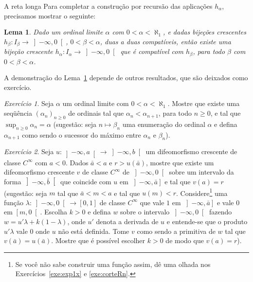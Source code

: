 \documentclass[oneside,11pt]{amsart}
\theoremstyle{remark}\newtheorem{exercise}{Exercício}[section]
\theoremstyle{plain}\newtheorem{teo}{Teorema}[section]
\theoremstyle{plain}\newtheorem{lem}[teo]{Lema}
\theoremstyle{plain}\newtheorem{prop}[teo]{Proposição}
\theoremstyle{definition}\newtheorem{defin}[teo]{Definição}
\theoremstyle{remark}\newtheorem{rem}[teo]{Observação}
\theoremstyle{definition}\newtheorem{example}[teo]{Exemplo}
\numberwithin{equation}{section}
\begin{document}
\begin{section}{A reta longa}
Para completar a construção por recursão das aplicações $h_\alpha$, precisamos mostrar o seguinte:
\begin{lem}\label{thm:lemaordlim}
Dado um ordinal limite $\alpha$ com $0<\alpha<\aleph_1$, e dadas bijeções crescentes $h_\beta:I_\beta\to\left]-\infty,0\right[$, $0<\beta<\alpha$,
duas a duas compatíveis, então existe uma bijeção crescente $h_\alpha:I_\alpha\to\left]-\infty,0\right[$ que é compatível com $h_\beta$, para todo $\beta$
com $0<\beta<\alpha$.
\end{lem}

A demonstração do Lema~\ref{thm:lemaordlim} depende de outros resultados, que são deixados como exercício.

\begin{exercise}\label{exe:cofomega}
Seja $\alpha$ um ordinal limite com $0<\alpha<\aleph_1$. Mostre que existe uma seqüência $(\alpha_n)_{n\ge0}$ de ordinais tal que
$\alpha_n<\alpha_{n+1}$, para todo $n\ge0$, e tal que $\sup_{n\ge0}\alpha_n=\alpha$ (sugestão: seja $n\mapsto\beta_n$ uma enumeração
do ordinal $\alpha$ e defina $\alpha_{n+1}$ como sendo o sucessor do máximo entre $\alpha_n$ e $\beta_n$).
\end{exercise}

\begin{exercise}\label{exe:extenddifeo}
Seja $u:\left]-\infty,a\right[\to\left]-\infty,b\right[$ um difeomorfismo crescente de classe $C^\infty$ com $a<0$. Dados $\bar a<a$ e $r>u(\bar a)$, mostre que existe
um difeomorfismo crescente $v$ de classe $C^\infty$ de $\left]-\infty,0\right[$ sobre um intervalo da forma $\left]-\infty,\bar b\right[$
que coincide com $u$ em $\left]-\infty,\bar a\right]$
e tal que $v(a)=r$ (sugestão: seja $m$ tal que $\bar a<m<a$ e tal que $u(m)<r$. Considere\footnote{%
Se você não sabe construir uma função assim, dê uma olhada nos Exercícios~\ref{exe:exp1x} e \ref{exe:corteRn}.}
uma função $\lambda:\left]-\infty,0\right[\to[0,1]$
de classe $C^\infty$ que vale $1$ em $\left]-\infty,\bar a\right]$ e vale $0$ em $\left[m,0\right[$. Escolha $k>0$ e defina $w$ sobre o intervalo
$\left]-\infty,0\right[$ fazendo $w=u'\lambda+k(1-\lambda)$, onde $u'$ denota a derivada de $u$ e entende-se que o produto $u'\lambda$ vale $0$ onde $u$ não está
definida. Tome $v$ como sendo a primitiva de $w$ tal que $v(\bar a)=u(\bar a)$. Mostre que é possível escolher $k>0$ de modo que $v(a)=r$).
\end{exercise}


\end{section}
\end{document}

